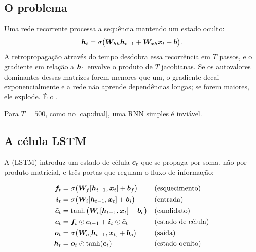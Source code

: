 \subsection{O problema}

Uma rede recorrente processa a sequência mantendo um estado oculto:
\begin{equation}
  \bm{h}_t = \sigma\big( \bm{W}_{hh}\bm{h}_{t-1} + \bm{W}_{xh}\bm{x}_t + \bm{b} \big).
  \label{eq:rnn}
\end{equation}
A retropropagação através do tempo desdobra essa recorrência em $T$ passos, e o
gradiente em relação a $\bm{h}_1$ envolve o produto de $T$ jacobianas. Se os autovalores
dominantes dessas matrizes forem menores que um, o gradiente decai exponencialmente e a
rede não aprende dependências longas; se forem maiores, ele explode. É o
\citep{SCHMIDHUBER201585}.

Para $T = 500$, como no \cref{cap:dual}, uma RNN simples é inviável.

\subsection{A célula LSTM}

A  (LSTM)
\citep{Hochreiter1997} introduz um estado de célula $\bm{c}_t$ que se propaga por
soma, não por produto matricial, e três portas que regulam o fluxo de informação:

\begin{align}
\bm{f}_t &= \sigma\big(\bm{W}_f [\bm{h}_{t-1}, \bm{x}_t] + \bm{b}_f\big)
  && \text{(esquecimento)} \label{eq:lstm-f}\\
\bm{i}_t &= \sigma\big(\bm{W}_i [\bm{h}_{t-1}, \bm{x}_t] + \bm{b}_i\big)
  && \text{(entrada)} \label{eq:lstm-i}\\
\tilde{\bm{c}}_t &= \tanh\big(\bm{W}_c [\bm{h}_{t-1}, \bm{x}_t] + \bm{b}_c\big)
  && \text{(candidato)} \label{eq:lstm-c}\\
\bm{c}_t &= \bm{f}_t \odot \bm{c}_{t-1} + \bm{i}_t \odot \tilde{\bm{c}}_t
  && \text{(estado de célula)} \label{eq:lstm-cell}\\
\bm{o}_t &= \sigma\big(\bm{W}_o [\bm{h}_{t-1}, \bm{x}_t] + \bm{b}_o\big)
  && \text{(saída)} \label{eq:lstm-o}\\
\bm{h}_t &= \bm{o}_t \odot \tanh(\bm{c}_t)
  && \text{(estado oculto)} \label{eq:lstm-h}
\end{align}

